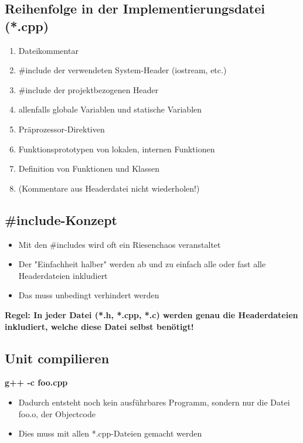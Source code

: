\subsection{Reihenfolge in der Implementierungsdatei (*.cpp)}
\label{sec:Reihenfolge in der Implementierungsdatei}
\begin{enumerate}
	\item Dateikommentar
	\item \#include der verwendeten System-Header (iostream, etc.)
	\item \#include der projektbezogenen Header
	\item allenfalls globale Variablen und statische Variablen
	\item Präprozessor-Direktiven
	\item Funktionsprototypen von lokalen, internen Funktionen
	\item Definition von Funktionen und Klassen
	\item[\-] \color{red} (Kommentare aus Headerdatei nicht wiederholen!)
\end{enumerate}

\subsection{\#include-Konzept}
\label{sec:include-Konzept}
\begin{itemize}
	\item Mit den \#includes wird oft ein Riesenchaos veranstaltet
	\item Der "Einfachheit halber" werden ab und zu einfach alle oder fast alle Headerdateien inkludiert
	\item Das muss unbedingt verhindert werden
\end{itemize}
\textbf{Regel: In jeder Datei (*.h, *.cpp, *.c) werden genau die Headerdateien inkludiert, welche diese Datei selbst benötigt!}

\subsection{Unit compilieren}
\label{sec:Unit compilieren}
\begin{center}
	\textbf{g++ \color{red}-c\color{black} foo.cpp}
\end{center}
\begin{itemize}
	\item Dadurch entsteht noch kein ausführbares Programm, sondern nur die Datei foo.o, der Objectcode
	\item Dies muss mit allen *.cpp-Dateien gemacht werden
\end{itemize}

